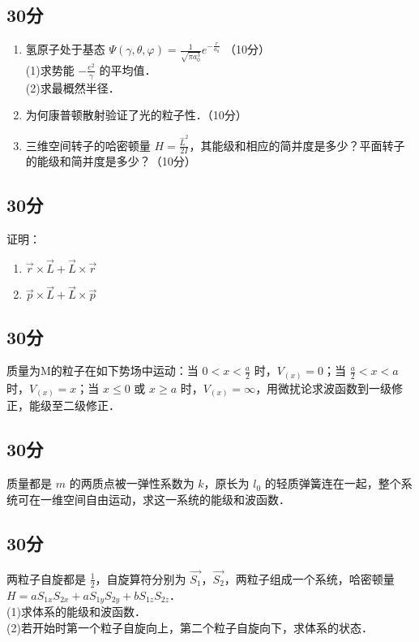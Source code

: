 
\subsection{30分}
\begin{enumerate}
\item 氢原子处于基态 $\varPsi(\gamma,\theta,\varphi)=\frac{1}{\sqrt{\pi a^{3}_{0}}}e^{-\frac{r}{a_0}}$ （10分）\\
(1)求势能 $-\frac{e^2}{\gamma}$ 的平均值．\\
(2)求最概然半径．\\
\item 为何康普顿散射验证了光的粒子性．（10分）\\
\item 三维空间转子的哈密顿量 $H=\frac{\hat{L}^2}{2I}$，其能级和相应的简并度是多少？平面转子的能级和简并度是多少？（10分）\\
\end{enumerate}
\subsection{30分}
证明：\\
\begin{enumerate}
\item $\vec{r}\times \vec{L}+ \vec{L}\times \vec{r}$
\item $\vec{p}\times\vec{L}+\vec{L}\times\vec{p}$
\end{enumerate}
\subsection{30分}
质量为M的粒子在如下势场中运动：当 $0<x<\frac{a}{2}$ 时，$V_{(x)}=0$；当 $\frac{a}{2} <x<a$ 时，$V_{(x)}=x$；当 $x \le 0$ 或 $x \ge a$ 时，$V_{(x)}=\infty$，用微扰论求波函数到一级修正，能级至二级修正．
\subsection{30分}
质量都是 $m$ 的两质点被一弹性系数为 $k$，原长为 $l_{0}$ 的轻质弹簧连在一起，整个系统可在一维空间自由运动，求这一系统的能级和波函数．
\subsection{30分}
两粒子自旋都是 $\frac{1}{2}$，自旋算符分别为 $\vec{S_{1}}$，$\vec{S_{2}}$，两粒子组成一个系统，哈密顿量 $H=aS_{1x}S_{2x}+aS_{1y}S_{2y}+bS_{1z}S_{2z}$．\\
(1)求体系的能级和波函数．\\
(2)若开始时第一个粒子自旋向上，第二个粒子自旋向下，求体系的状态．\\